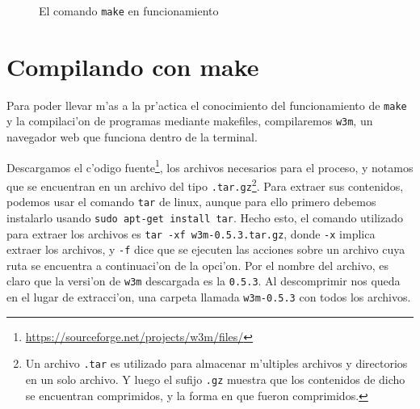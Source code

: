 \documentclass[11pt]{article}
\begin{document}
		\begin{figure}[H]
			\centering
			 \par
			
			\caption{El comando \texttt{make} en funcionamiento}
			\label{fig:makefile-successful-compile}
		\end{figure}
		
		
	\section{Compilando con make}
	
	Para poder llevar m'as a la pr'actica el conocimiento del funcionamiento de \texttt{make} y la compilaci'on de programas mediante makefiles, compilaremos \texttt{w3m}, un navegador web que funciona dentro de la terminal.
	
	Descargamos el c'odigo fuente\footnote{\url{https://sourceforge.net/projects/w3m/files/}}, los archivos necesarios para el proceso, y notamos que se encuentran en un archivo del tipo \texttt{.tar.gz}\footnote{Un archivo \texttt{.tar} es utilizado para almacenar m'ultiples archivos y directorios en un solo archivo. Y luego el sufijo \texttt{.gz} muestra que los contenidos de dicho se encuentran comprimidos, y la forma en que fueron comprimidos.}. Para extraer sus contenidos, podemos usar el comando \texttt{tar} de linux, aunque para ello primero debemos instalarlo usando \texttt{sudo apt-get install tar}. Hecho esto, el comando utilizado para extraer los archivos es \texttt{tar -xf w3m-0.5.3.tar.gz}, donde \texttt{-x} implica extraer los archivos, y \texttt{-f} dice que se ejecuten las acciones sobre un archivo cuya ruta se encuentra a continuaci'on de la opci'on. Por el nombre del archivo, es claro que la versi'on de \texttt{w3m} descargada es la \texttt{0.5.3}. Al descomprimir nos queda en el lugar de extracci'on, una carpeta llamada \texttt{w3m-0.5.3} con todos los archivos.
	
\end{document}
